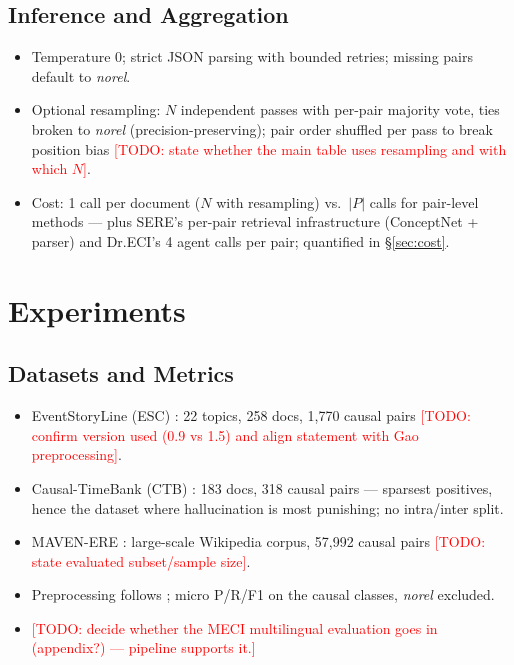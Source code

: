 \documentclass[11pt]{article}
\newcommand{\todo}[1]{\textcolor{red}{[TODO: #1]}}
\begin{document}
\subsection{Inference and Aggregation}
\label{sec:inference}
\begin{itemize}
  \item Temperature 0; strict JSON parsing with bounded retries; missing pairs
        default to \textit{norel}.
  \item Optional resampling: $N$ independent passes with per-pair majority
        vote, ties broken to \textit{norel} (precision-preserving); pair order
        shuffled per pass to break position bias \todo{state whether the main
        table uses resampling and with which $N$}.
  \item Cost: 1 call per document ($N$ with resampling) vs.\ $|P|$ calls for
        pair-level methods --- plus SERE's per-pair retrieval infrastructure
        (ConceptNet + parser) and Dr.ECI's 4 agent calls per pair; quantified
        in \S\ref{sec:cost}.
\end{itemize}

\section{Experiments}
\label{sec:experiments}

\subsection{Datasets and Metrics}
\begin{itemize}
  \item EventStoryLine (ESC) \citep{caselli2017event}: 22 topics, 258 docs,
        1{,}770 causal pairs \todo{confirm version used (0.9 vs 1.5) and align
        statement with Gao preprocessing}.
  \item Causal-TimeBank (CTB) \citep{mirza2014annotating}: 183 docs, 318 causal
        pairs --- sparsest positives, hence the dataset where hallucination is
        most punishing; no intra/inter split.
  \item MAVEN-ERE \citep{wang2022mavenere}: large-scale Wikipedia corpus,
        57{,}992 causal pairs \todo{state evaluated subset/sample size}.
  \item Preprocessing follows \citet{gao2023chatgpt}; micro P/R/F1 on the causal
        classes, \textit{norel} excluded.
  \item \todo{decide whether the MECI multilingual evaluation
        \citep{lai2022meci} goes in (appendix?) --- pipeline supports it.}
\end{itemize}
\end{document}
